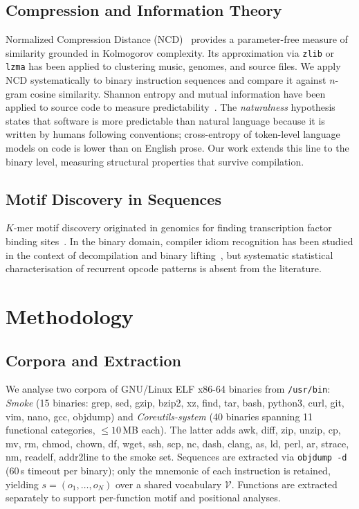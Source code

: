 \documentclass[conference]{IEEEtran}
\newcommand{\zlib}{\texttt{zlib}}
\newcommand{\lzma}{\texttt{lzma}}
\begin{document}
\subsection{Compression and Information Theory}
Normalized Compression Distance
(NCD)~\cite{cilibrasi2005clustering} provides a parameter-free measure of
similarity grounded in Kolmogorov complexity.  Its approximation via
\zlib{} or \lzma{} has been applied to clustering music, genomes, and
source files.  We apply NCD systematically to binary instruction sequences
and compare it against $n$-gram cosine similarity.
Shannon entropy and mutual information have been applied to source code to
measure predictability~\cite{hindle2012naturalness,tu2014localness}.  The
\emph{naturalness} hypothesis~\cite{hindle2012naturalness} states that
software is more predictable than natural language because it is written
by humans following conventions; cross-entropy of token-level language
models on code is lower than on English prose.  Our work extends this line
to the binary level, measuring structural properties that survive
compilation.

\subsection{Motif Discovery in Sequences}
$K$-mer motif discovery originated in genomics for finding transcription
factor binding sites~\cite{das2007survey}.  In the binary domain, compiler
idiom recognition has been studied in the context of decompilation and
binary lifting~\cite{schulte2018evolving}, but systematic statistical
characterisation of recurrent opcode patterns is absent from the
literature.

\section{Methodology}
\label{sec:methodology}

\subsection{Corpora and Extraction}
We analyse two corpora of GNU/Linux ELF x86-64 binaries
from \texttt{/usr/bin}: \emph{Smoke} (15 binaries: grep, sed, gzip, bzip2,
xz, find, tar, bash, python3, curl, git, vim, nano, gcc, objdump) and
\emph{Coreutils-system} (40 binaries spanning 11 functional categories,
$\leq 10$\,MB each).  The latter adds awk, diff, zip, unzip, cp, mv, rm,
chmod, chown, df, wget, ssh, scp, nc, dash, clang, as, ld, perl, ar,
strace, nm, readelf, addr2line to the smoke set.  Sequences are extracted
via \texttt{objdump -d} (60\,s timeout per binary); only the mnemonic of
each instruction is retained, yielding $s{=}(o_1,\dots,o_N)$ over a
shared vocabulary $\mathcal{V}$.  Functions are extracted separately to
support per-function motif and positional analyses.
\end{document}

